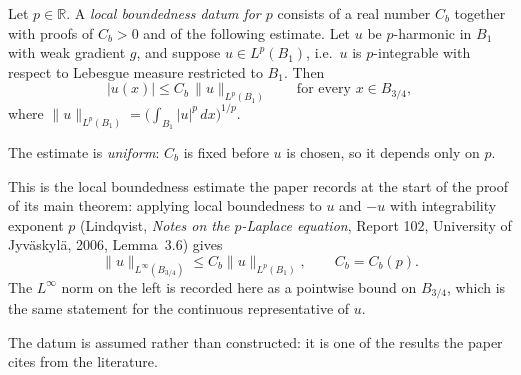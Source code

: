 \begin{definition}
Let $p\in\mathbb{R}$.  A \emph{local boundedness datum for $p$} consists of a real number
$C_b$ together with proofs of $C_b>0$ and of the following estimate.  Let $u$ be
$p$-harmonic in $B_1$ with weak gradient $g$, and suppose $u\in L^p(B_1)$, i.e.\ $u$ is
$p$-integrable with respect to Lebesgue measure restricted to $B_1$.  Then
\[
  \lvert u(x)\rvert\le C_b\,\lVert u\rVert_{L^p(B_1)}
  \qquad\text{for every }x\in B_{3/4},
\]
where $\lVert u\rVert_{L^p(B_1)}=\bigl(\int_{B_1}\lvert u\rvert^{p}\,dx\bigr)^{1/p}$.

The estimate is \emph{uniform}: $C_b$ is fixed before $u$ is chosen, so it depends only on
$p$.

This is the local boundedness estimate the paper records at the start of the proof of its
main theorem: applying local boundedness to $u$ and $-u$ with integrability exponent $p$
(Lindqvist, \emph{Notes on the $p$-Laplace equation}, Report 102, University of
Jyv\"askyl\"a, 2006, Lemma~3.6) gives
\[
  \lVert u\rVert_{L^\infty(B_{3/4})}\le C_b\lVert u\rVert_{L^p(B_1)},\qquad C_b=C_b(p).
\]
The $L^\infty$ norm on the left is recorded here as a pointwise bound on $B_{3/4}$, which is
the same statement for the continuous representative of $u$.

The datum is assumed rather than constructed: it is one of the results the paper cites from
the literature.
\end{definition}
